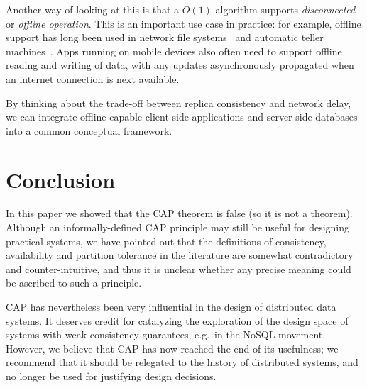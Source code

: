 \documentclass[a4paper,twocolumn,10pt]{article}
\begin{document}
Another way of looking at this is that a $O(1)$ algorithm supports \emph{disconnected} or
\emph{offline operation}. This is an important use case in practice: for example, offline support
has long been used in network file systems~\cite{Kistler1992bt} and automatic teller
machines~\cite{Brewer2012tr}. Apps running on mobile devices also often need to support offline
reading and writing of data, with any updates asynchronously propagated when an internet connection
is next available.

By thinking about the trade-off between replica consistency and network delay, we can integrate
offline-capable client-side applications and server-side databases into a common conceptual
framework.



\section{Conclusion}

In this paper we showed that the CAP theorem is false (so it is not a theorem). Although an
informally-defined CAP principle may still be useful for designing practical systems, we have
pointed out that the definitions of consistency, availability and partition tolerance in the
literature are somewhat contradictory and counter-intuitive, and thus it is unclear whether any
precise meaning could be ascribed to such a principle.

CAP has nevertheless been very influential in the design of distributed data systems. It deserves
credit for catalyzing the exploration of the design space of systems with weak consistency
guarantees, e.g.\ in the NoSQL movement. However, we believe that CAP has now reached the end of its
usefulness; we recommend that it should be relegated to the history of distributed systems, and no
longer be used for justifying design decisions.
\end{document}

